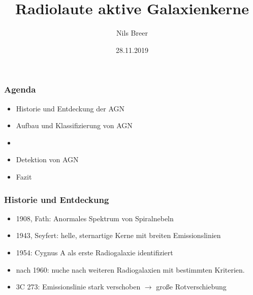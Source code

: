 \documentclass[aspectratio=1610, 9pt]{beamer}
\title{Radiolaute aktive Galaxienkerne}
\author[N.Breer]{Nils Breer}
\institute{Fakultät Physik}
\date{28.11.2019}
\begin{document}
\maketitle

\begin{frame}\frametitle{Agenda}
  \begin{itemize}
    \item Historie und Entdeckung der AGN
    \item Aufbau und Klassifizierung von AGN
    \item 
    \item Detektion von AGN
    \item Fazit
  \end{itemize}
\end{frame}

\begin{frame}\frametitle{Historie und Entdeckung}
  \begin{itemize}
    \item 1908, Fath: Anormales Spektrum von Spiralnebeln
    \item 1943, Seyfert: helle, sternartige Kerne mit breiten Emissionslinien
    \item 1954: Cygnus A als erste Radiogalaxie identifiziert
    \item nach 1960: nuche nach weiteren Radiogalaxien mit bestimmten Kriterien.
    \item 3C 273: Emissionslinie stark verschoben $\to$ gro\ss e Rotverschiebung
  \end{itemize}
\end{frame}

\end{document}
